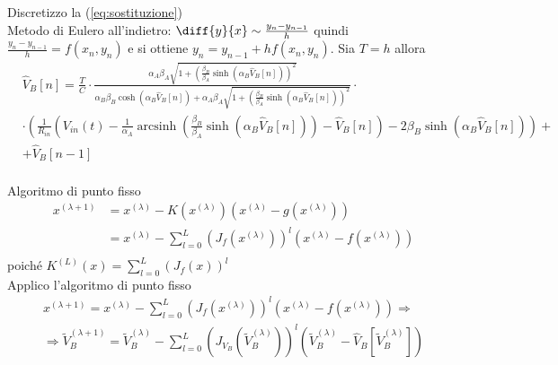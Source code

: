 \documentclass[12pt,a4paper,twoside,english,italian]{book}
\DeclareMathOperator{\arcsinh}{arcsinh}
\begin{document}
		Discretizzo la (\ref{eq:sostituzione})\\
		Metodo di Eulero all'indietro: $\diff{y}{x} \sim \frac{y_{n}-y_{n-1}}{h}$ quindi $\frac{y_{n}-y_{n-1}}{h} = f(x_{n},y_{n})$ e si ottiene $y_{n} = y_{n-1}+hf(x_{n},y_{n})$. Sia $T = h$ allora
		\begin{equation}
			\label{eq:discretizzazione}
			\begin{split}
				&\widehat V_{B}[n] = \frac{T}{C}\cdot\frac{\alpha_{A}\beta_{A}\sqrt{1+\left(\frac{\beta_{B}}{\beta_{A}}\sinh(\alpha_{B}\widehat V_{B}[n])\right)^{2}}}{\alpha_{B}\beta_{B}\cosh(\alpha_{B}\widehat V_{B}[n])+\alpha_{A}\beta_{A}\sqrt{1+\left(\frac{\beta_{B}}{\beta_{A}}\sinh(\alpha_{B}\widehat V_{B}[n])\right)^{2}}}\cdot\\&\cdot\left(\frac{1}{R_{in}}\left(V_{in}(t)-\frac{1}{\alpha_{A}} \arcsinh \left(\frac{\beta_{B}}{\beta_{A}} \sinh(\alpha_{B}\widehat V_{B}[n])\right)-\widehat V_{B}[n]\right)-2\beta_{B}\sinh(\alpha_{B}\widehat V_{B}[n])\right)+\\&+\widehat V_{B}[n-1]\\
			\end{split}
		\end{equation}
		
		Algoritmo di punto fisso
		\begin{equation}
			\label{eq:punto_fisso1}
			\begin{split}
				x^{(\lambda+1)} &= x^{(\lambda)}-K(x^{(\lambda)})(x^{(\lambda)}-g(x^{(\lambda)}))\\
				&= x^{(\lambda)}-\sum_{l=0}^{L} \left(J_{f}(x^{(\lambda)})\right)^{l}(x^{(\lambda)}-f(x^{(\lambda)}))\\
			\end{split}
		\end{equation}
		poiché $K^{(L)}(x) = \sum_{l=0}^{L} \left(J_{f}(x)\right)^{l}$\\
		
		Applico l'algoritmo di punto fisso
		\begin{equation}
			\label{eq:punto_fisso2}
			\begin{split}
				x^{(\lambda+1)} = x^{(\lambda)}-\sum_{l=0}^{L} \left(J_{f}(x^{(\lambda)})\right)^{l}(x^{(\lambda)}-f(x^{(\lambda)}))\Rightarrow\\
				\Rightarrow \widetilde V_{B}^{(\lambda+1)} = \widetilde V_{B}^{(\lambda)}-\sum_{l=0}^{L} \left(J_{V_{B}}(\widetilde V_{B}^{(\lambda)})\right)^{l}(\widetilde V_{B}^{(\lambda)}-\widehat V_{B}[\widetilde V_{B}^{(\lambda)}])
			\end{split}
		\end{equation}
		
\end{document}
